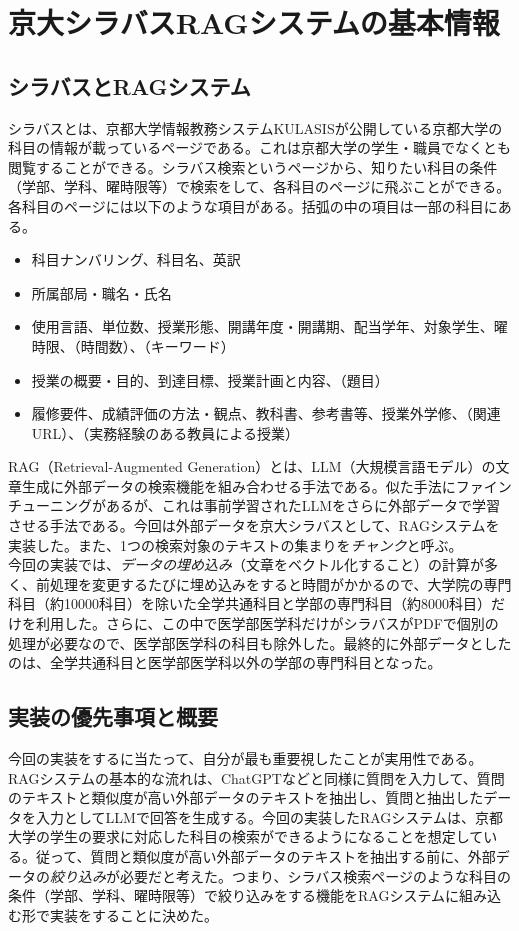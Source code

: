 \section{京大シラバスRAGシステムの基本情報}
\subsection{シラバスとRAGシステム}
シラバスとは、京都大学情報教務システムKULASISが公開している京都大学の科目の情報が載っているページである。これは京都大学の学生・職員でなくとも閲覧することができる。シラバス検索というページから、知りたい科目の条件（学部、学科、曜時限等）で検索をして、各科目のページに飛ぶことができる。各科目のページには以下のような項目がある。括弧の中の項目は一部の科目にある。\\

\begin{itemize}
  \item 科目ナンバリング、科目名、英訳
  \item 所属部局・職名・氏名
  \item 使用言語、単位数、授業形態、開講年度・開講期、配当学年、対象学生、曜時限、（時間数）、（キーワード）
  \item 授業の概要・目的、到達目標、授業計画と内容、（題目）
  \item 履修要件、成績評価の方法・観点、教科書、参考書等、授業外学修、（関連URL）、（実務経験のある教員による授業）
\end{itemize}

RAG（Retrieval-Augmented Generation）とは、LLM（大規模言語モデル）の文章生成に外部データの検索機能を組み合わせる手法である。似た手法にファインチューニングがあるが、これは事前学習されたLLMをさらに外部データで学習させる手法である。今回は外部データを京大シラバスとして、RAGシステムを実装した。また、1つの検索対象のテキストの集まりを\emph{チャンク}と呼ぶ。\\

今回の実装では、\emph{データの埋め込み}（文章をベクトル化すること）の計算が多く、前処理を変更するたびに埋め込みをすると時間がかかるので、大学院の専門科目（約10000科目）を除いた全学共通科目と学部の専門科目（約8000科目）だけを利用した。さらに、この中で医学部医学科だけがシラバスがPDFで個別の処理が必要なので、医学部医学科の科目も除外した。最終的に外部データとしたのは、全学共通科目と医学部医学科以外の学部の専門科目となった。\\

\subsection{実装の優先事項と概要}
今回の実装をするに当たって、自分が最も重要視したことが実用性である。RAGシステムの基本的な流れは、ChatGPTなどと同様に質問を入力して、質問のテキストと類似度が高い外部データのテキストを抽出し、質問と抽出したデータを入力としてLLMで回答を生成する。今回の実装したRAGシステムは、京都大学の学生の要求に対応した科目の検索ができるようになることを想定している。従って、質問と類似度が高い外部データのテキストを抽出する前に、外部データの\emph{絞り込み}が必要だと考えた。つまり、シラバス検索ページのような科目の条件（学部、学科、曜時限等）で絞り込みをする機能をRAGシステムに組み込む形で実装をすることに決めた。\\

